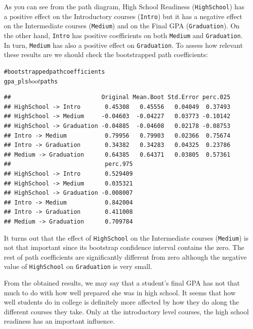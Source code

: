 \documentclass[12pt]{book}\usepackage{graphicx, color}
\makeatletter
\newcommand{\hlcomment}[1]{\textcolor[rgb]{0.180392156862745,0.6,0.341176470588235}{#1}}%
\newenvironment{kframe}{%
 \def\at@end@of@kframe{}%
 \ifinner\ifhmode%
  \def\at@end@of@kframe{\end{minipage}}%
  \begin{minipage}{\columnwidth}%
 \fi\fi%
 \def\FrameCommand##1{\hskip\@totalleftmargin \hskip-\fboxsep
 \colorbox{shadecolor}{##1}\hskip-\fboxsep
     \hskip-\linewidth \hskip-\@totalleftmargin \hskip\columnwidth}%
 \MakeFramed {\advance\hsize-\width
   \@totalleftmargin\z@ \linewidth\hsize
   \@setminipage}}%
 {\par\unskip\endMakeFramed%
 \at@end@of@kframe}
\newenvironment{knitrout}{}{} %
\newcommand{\code}[1]{\texttt{#1}}
\makeatother
\begin{document}
As you can see from the path diagram, High School Readiness (\code{HighSchool}) has a positive effect on the Introductory courses (\code{Intro}) but it has a negative effect on the Intermediate courses (\code{Medium}) and on the Final GPA (\code{Graduation}). On the other hand, \code{Intro} has positive coefficients on both \code{Medium} and \code{Graduation}. In turn, \code{Medium} has also a positive effect on \code{Graduation}. To assess how relevant these results are we should check the bootstrapped path coefficients:
\begin{knitrout}
\color{fgcolor}\begin{kframe}
\begin{alltt}
\hlcomment{# bootstrapped path coefficients}
gpa_pls$boot$paths
\end{alltt}
\begin{verbatim}
##                          Original Mean.Boot Std.Error perc.025
## HighSchool -> Intro       0.45308   0.45556   0.04049  0.37493
## HighSchool -> Medium     -0.04603  -0.04227   0.03773 -0.10142
## HighSchool -> Graduation -0.04885  -0.04608   0.02178 -0.08753
## Intro -> Medium           0.79956   0.79903   0.02366  0.75674
## Intro -> Graduation       0.34382   0.34283   0.04325  0.23786
## Medium -> Graduation      0.64385   0.64371   0.03805  0.57361
##                           perc.975
## HighSchool -> Intro       0.529409
## HighSchool -> Medium      0.035321
## HighSchool -> Graduation -0.008007
## Intro -> Medium           0.842004
## Intro -> Graduation       0.411008
## Medium -> Graduation      0.709784
\end{verbatim}
\end{kframe}
\end{knitrout}

It turns out that the effect of \code{HighSchool} on the Intermediate courses (\code{Medium}) is not that important since its bootstrap confidence interval contains the zero. The rest of path coefficients are significantly different from zero although the negative value of \code{HighSchool} on \code{Graduation} is very small. 

From the obtained results, we may say that a student's final GPA has not that much to do with how well prepared she was in high school. It seems that how well students do in college is definitely more affected by how they do along the different courses they take. Only at the introductory level courses, the high school readiness has an important influence.
\end{document}
